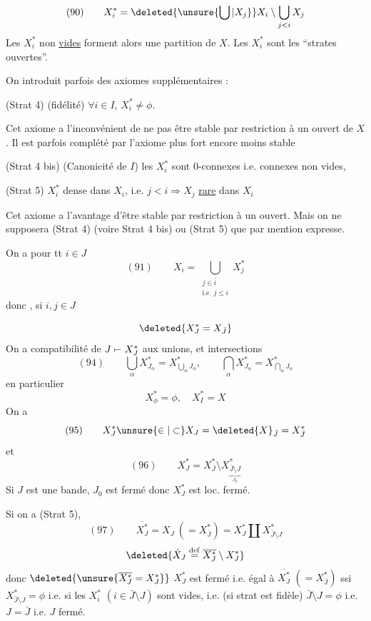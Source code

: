 
\[(90)\qquad X_i^*=\deleted{\unsure{\bigcup|X_j}}X_i\setminus\bigcup_{j<i}X_j\]
Les $X_i^*$ non \uline{vides} forment alors une partition de $X$. Les $X_i^*$ sont les ``strates ouvertes''.

On introduit parfois des axiomes supplémentaires :

(Strat 4) (fidélité) $\forall i\in I$, $X_i^*\neq\phi$.

Cet axiome a l'inconvénient de ne pas être stable par  restriction à un ouvert de $X$. Il est parfois complété par l'axiome plus fort encore moins stable

(Strat 4 bis) (Canonicité de $I$) les $X_i^*$ sont $0$-connexes i.e. connexes non vides,

(Strat 5)  $X_i^*$ dense dans $X_i$,  i.e. $j<i\Rightarrow X_j$ \uline{rare} dans $X_i$

Cet axiome a l'avantage d'être stable par restriction à un ouvert. Mais on ne supposera (Strat 4) (voire Strat 4 bis) ou (Strat 5) que par mention expresse.

On a pour tt $i\in J$
\[
(91)\qquad X_i=\bigcup_{\substack{j\in\bar i\\\text{i.e. }j\leq i}}X_j^*
\]
donc , si $i,j\in J$


\[
\deleted{X_J^*=X_{\bar J}}
\]
On a compatibilité de $J\mathrel{\mapstochar\relbar}X_J^*$ aux unions, et intersections
\[
(94)\qquad\bigcup_\alpha X_{J_\alpha}^*=X_{\bigcup_\alpha J_\alpha}^*,\qquad\bigcap_\alpha X_{J_\alpha}^*=X_{\bigcap_\alpha J_\alpha}^*
\]
en particulier
\[
X_\phi^*=\phi,\quad X_I^*=X
\]
On a
\[
(95)\qquad X_J^*\unsure{\in|\subset}X_J=\deleted{X}_{\bar J}=X_{\bar J}^*
\]
et
\[
(96)\qquad X_J^*=X_{\bar J}^*\setminus X_{\underbrace{\bar J\setminus J}_{J_0}}^*
\]
Si $J$ est une bande, $J_0$ est fermé donc $X_J^*$ est loc. fermé.

Si on a (Strat 5), 
\[
(97)\qquad\overline{X_J^*}=X_J\ (=X_{\bar J}^*)=X_J^*\amalg X_{\bar J\setminus J}^*
\]
\[
\deleted{\dot X_J\overset{\mathrm{def}}=\overline{X_J^*}\setminus X_J^*}
\]
donc $\deleted{\unsure{\overline{X_J^*}=X_J^*}}$ $X_J^*$ est fermé i.e. égal à $\overline{X_J^*}$ $(=X_{\bar J}^*)$ ssi $X_{\bar J\setminus J}^*=\phi$ i.e. si les $X_i^*$ $(i\in\bar J\setminus J)$ sont vides, i.e. (si strat est fidèle)  $\bar J\setminus J=\phi$ i.e. $J=\bar J$ i.e. $J$ fermé.

